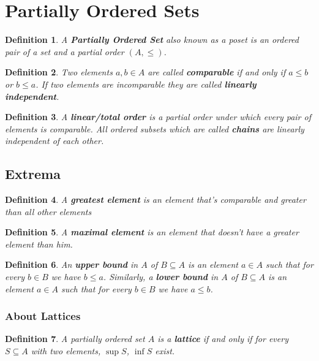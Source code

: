 \documentclass{article}
\theoremstyle{plain}
\newtheorem{definition}{Definition}[section]
\begin{document}
\section{Partially Ordered Sets}
\begin{definition}
	A \textbf{Partially Ordered Set} also known as a poset is an ordered
	pair of a set and a partial order $(A,\le)$.
\end{definition}
\begin{definition}
	Two elements $a, b \in A$ are called \textbf{comparable} if and
	only if $a \le b$ or $b \le a$. If two elements are incomparable 
	they are called \textbf{linearly independent}.
\end{definition}
\begin{definition}
A \textbf{linear/total order} is a partial order under which every pair of 
elements is comparable. All ordered subsets which are called \textbf{chains} 
are linearly independent of each other.
\end{definition}
\subsection{Extrema}
\begin{definition}
A \textbf{greatest element} is an element that's comparable and greater 
than all other elements
\end{definition}
\begin{definition}
A \textbf{maximal element} is an element that doesn't have a greater element 
than him.
\end{definition}
\begin{definition}
An \textbf{upper bound} in $A$ of $B\subseteq A$ is an element $a\in A$ such
that for every $b \in B$ we have $b \le a$. 
Similarly, a \textbf{lower bound} in 
$A$ of $B\subseteq A$ is an element $a \in A$ such that for every $b \in B$ 
we have $a \le b$.
\end{definition}

\subsubsection{About Lattices}
\begin{definition}
A partially ordered set $A$ is a \textbf{lattice} if and only if for
every $S\subseteq A$ with two elements, $\sup S$, $\inf S$ exist.
\end{definition}
    
\newpage
\end{document}
